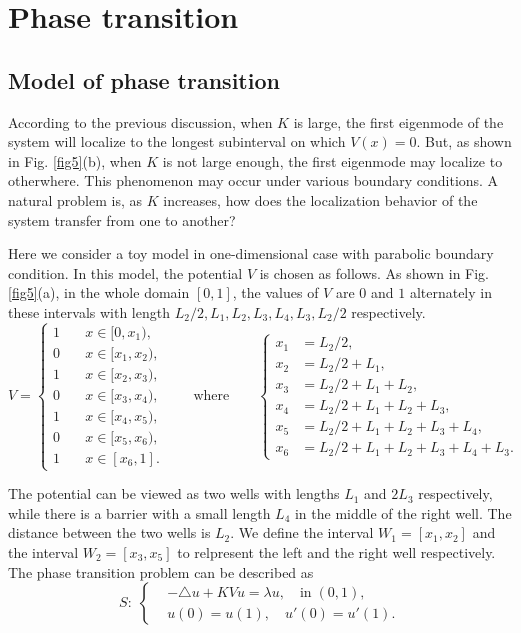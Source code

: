 \documentclass[a4paper,11pt]{article}
\begin{document}
\section{Phase transition}

\subsection{Model of phase transition}

According to the previous discussion, when $K$ is large, the first eigenmode of the system will localize to the longest subinterval on which $V(x) = 0$. But, as shown in Fig. \ref{fig5}(b), when $K$ is not large enough, the first eigenmode may localize to otherwhere. This phenomenon may occur under various boundary conditions. A natural problem is, as $K$ increases, how does the localization behavior of the system transfer from one to another?

Here we consider a toy model in one-dimensional case with parabolic boundary condition. In this model, the potential $V$ is chosen as follows. As shown in Fig. \ref{fig5}(a), in the whole domain $[0, 1]$, the values of $V$ are $0$ and $1$ alternately in these intervals with length $L_2/2, L_1, L_2, L_3, L_4, L_3, L_2/2$ respectively.
\begin{equation*}
V = \left\{
\begin{split}
1 & \quad x \in [0, x_1), \\
0 & \quad x \in [x_1, x_2), \\
1 & \quad x \in [x_2, x_3), \\
0 & \quad x \in [x_3, x_4), \\
1 & \quad x \in [x_4, x_5), \\
0 & \quad x \in [x_5, x_6), \\
1 & \quad x \in [x_6, 1].
\end{split}
\right.
\qquad
\text{where}
\qquad
\left\{
\begin{split}
x_1 & = L_2/2, \\
x_2 & = L_2/2 + L_1, \\
x_3 & = L_2/2 + L_1 + L_2, \\
x_4 & = L_2/2 + L_1 + L_2 + L_3, \\
x_5 & = L_2/2 + L_1 + L_2 + L_3 + L_4, \\
x_6 & = L_2/2 + L_1 + L_2 + L_3 + L_4 + L_3.
\end{split}
\right.
\end{equation*}

The potential can be viewed as two wells with lengths $L_1$ and $2 L_3$ respectively, while there is a barrier with a small length $L_4$ in the middle of the right well. The distance between the two wells is $L_2$. We define the interval $W_1 = [x_1, x_2]$ and the interval $W_2 = [x_3, x_5]$ to relpresent the left and the right well respectively. The phase transition problem can be described as
\begin{equation}
S: \;
\left\{
\begin{split}
& -\triangle u + K V u = \lambda u, \quad \textrm{in} \; (0, 1), \\
& u(0) = u(1), \quad u'(0) =  u'(1).
\end{split}
\right.
\end{equation}
\end{document}
